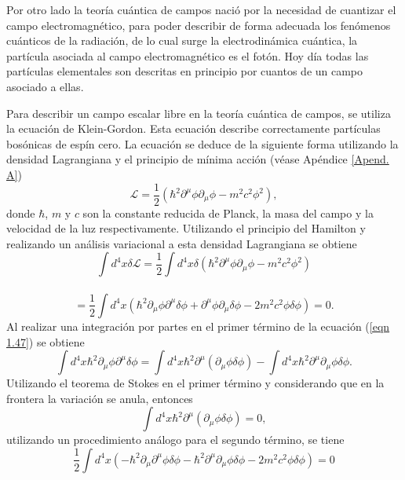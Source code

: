 \documentclass[a4paper,openright,12pt]{book}
\begin{document}
Por otro lado la teoría cuántica de campos nació por la necesidad de cuantizar el campo electromagnético, para poder describir de forma adecuada los fenómenos cuánticos de la radiación, de lo cual surge la electrodinámica cuántica, la partícula asociada al campo electromagnético es el fotón. Hoy día todas las partículas elementales son descritas en principio por cuantos de un campo asociado a ellas.

Para describir un campo escalar libre en la teoría cuántica de campos, se utiliza la ecuación de Klein-Gordon. Esta ecuación describe correctamente partículas bosónicas de espín cero. La ecuación se deduce de la siguiente forma utilizando la densidad Lagrangiana y el principio de mínima acción (véase Apéndice \ref{Apend. A})
\begin{equation}
\mathcal{L} = \frac{1}{2}(\hbar^{2}\partial^{\mu}\phi\partial_{\mu}\phi -m^{2}c^{2}\phi^{2}),\label{eqn 1.46}
\end{equation}
donde $\hbar$, $m$ y $c$ son la constante reducida de Planck, la masa del campo y la velocidad de la luz respectivamente. Utilizando el principio del Hamilton y realizando un análisis variacional a esta densidad Lagrangiana se obtiene
\begin{equation*}
\int d^{4}x\delta\mathcal{L}
=
\frac{1}{2} \int d^{4}x\delta(\hbar^{2}\partial^{\mu}\phi\partial_{\mu}\phi -m^{2}c^{2}\phi^{2})
\end{equation*}\
\begin{equation}
= \frac{1}{2}\int d^{4}x(\hbar^{2}\partial_{\mu}\phi\partial^{\mu}\delta\phi 
+ \partial^{\mu}\phi\partial_{\mu}\delta\phi 
-2m^{2}c^{2}\phi\delta\phi)
= 0.
\label{eqn 1.47}
\end{equation}
Al realizar una integración por partes en el primer término de la ecuación (\ref{eqn 1.47}) se obtiene
\begin{equation}
\int d^{4}x\hbar^{2}\partial_{\mu}\phi\partial^{\mu}\delta\phi 
=
\int d^{4}x\hbar^{2}\partial^{\mu}(\partial_{\mu}\phi\delta\phi)
-
\int d^{4}x\hbar^{2}\partial^{\mu}\partial_{\mu}\phi\delta\phi.\label{eqn 1.48}
\end{equation}
Utilizando el teorema de Stokes en el primer término y considerando que en la frontera la variación se anula, entonces
\begin{equation}
\int d^{4}x\hbar^{2}\partial^{\mu}(\partial_{\mu}\phi\delta\phi)=0,\label{eqn 1.49}
\end{equation}
utilizando un procedimiento análogo para el segundo término, se tiene
\begin{equation*}
\frac{1}{2} \int d^{4}x (-\hbar^{2}\partial_{\mu}\partial^{\mu}\phi\delta\phi
- \hbar^{2}\partial^{\mu}\partial_{\mu}\phi\delta\phi
- 2m^{2}c^{2}\phi\delta\phi) = 0
\end{equation*}
\end{document}
